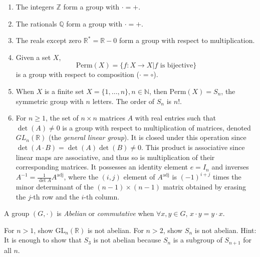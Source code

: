 \documentclass{article}
\begin{document}
\begin{xmpl}
  \begin{enumerate}
    \item{The integers $\mathbb{Z}$ form a group with $\cdot = +$.}
    \item{The rationals $\mathbb{Q}$ form a group with $\cdot = +$.}
    \item{The reals except zero $\mathbb{R}^\ast = \mathbb{R} - {0}$ 
          form a group with respect to multiplication.}
    \item{Given a set $X$, 
          $$
          \mathrm{Perm}(X) = \{f : X \to X | f \text{ is bijective}\}
          $$
          is a group with respect to composition ($\cdot = \circ$).
          }
     \item{When $X$ is a finite set $X = \{1, \dots, n\}, n \in \mathbb{N}$,
           then $\mathrm{Perm}(X) = S_n$, the symmetric group with $n$ letters.
           The order of $S_n$ is $n!$.
          }
     \item{For $n \geq 1$, the set of $n \times n$ matrices $A$ 
           with real entries such that $\det(A) \neq 0$ is a
           group with respect to multiplication of matrices, denoted
           $GL_n(\mathbb{R})$ (the \emph{general linear group}). 
           It is closed under this operation since
           $\det(A \cdot B) = \det(A) \det(B) \neq 0$. This product is
           associative since linear maps are associative, and thus so is
           multiplication of their corresponding matrices. It possesses 
           an identity element $e = I_n$ and inverses
           $A^{-1} = \frac{1}{\det A} A^{\mathrm{adj}}$, where
           the $(i, j)$ element of $A^{\mathrm{adj}}$ is $(-1)^{i + j}$ times
           the minor determinant of the $(n-1) \times (n-1)$ matrix obtained
           by erasing the $j$-th row and the $i$-th column.
           }
  \end{enumerate}
\end{xmpl}

\begin{defn}
  \label{def:abelian-group}
  A group $(G, \cdot)$ is \emph{Abelian} or \emph{commutative} when
  $\forall x, y \in G$, $x \cdot y = y \cdot x$.
\end{defn}

\begin{exer}
  For $n > 1$, show $\mathrm{GL}_n(\mathbb{R})$ is not abelian.
  For $n > 2$, show $S_n$ is not abelian.
  Hint: It is enough to show that $S_3$ is not abelian because
  $S_n$ is a subgroup of $S_{n+1}$ for all $n$.
\end{exer}
\end{document}
